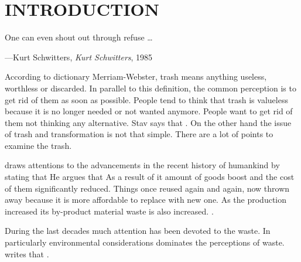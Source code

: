 \chapter{INTRODUCTION}



\begin{singlespace}
\epigraph{One can even shout out through refuse \ldots}{\hfill---Kurt Schwitters, \textit{Kurt Schwitters}, 1985}
\end{singlespace}



According to dictionary Merriam-Webster, trash means anything useless, worthless or discarded. In parallel to this definition, the common perception is to get rid of them as soon as possible. People tend to think that trash is valueless because it is no longer needed or not wanted anymore. People want to get rid of them not thinking any alternative. Stav says that  \citep[as cited in][]{navarro2015followingtrash}. On the other hand the issue of trash and transformation is not that simple. There are a lot of points to examine the trash.

\citet[11]{banash2013collage} draws attentions to the advancements in the recent history of humankind by stating that  He argues that  As a result of it amount of goods boost and the cost of them significantly reduced. Things once reused again and again, now thrown away because it is more affordable to replace with new one. As the production increased its by-product material waste is also increased.  \citep[ix]{pye2010trashculture}.

During the last decades much attention has been devoted to the waste. In particularly environmental considerations dominates the perceptions of waste. \citet[41]{ibarra2015beautiful} writes that .


